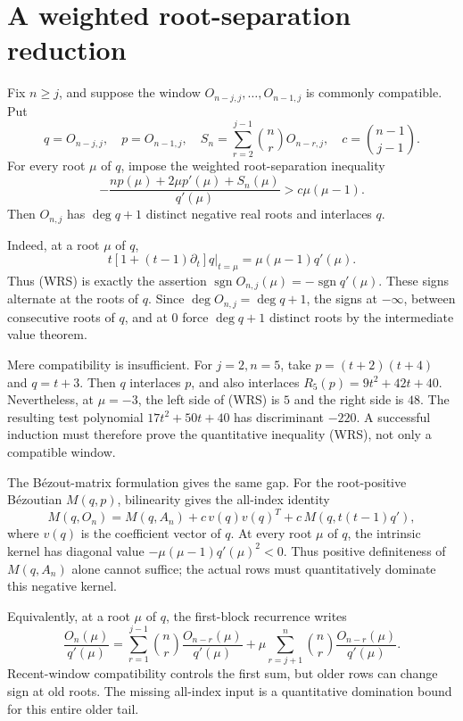 \documentclass[11pt]{article}
\theoremstyle{definition}
\newcommand{\OO}{O}
\begin{document}
\section{A weighted root-separation reduction}

Fix \(n\ge j\), and suppose the window
\(\OO_{n-j,j},\ldots,\OO_{n-1,j}\) is commonly compatible. Put
\[
q=\OO_{n-j,j},\quad p=\OO_{n-1,j},\quad
S_n=\sum_{r=2}^{j-1}\binom nr\OO_{n-r,j},\quad
c=\binom{n-1}{j-1}.
\]
For every root \(\mu\) of \(q\), impose the weighted root-separation inequality
\[
-\frac{n p(\mu)+2\mu p'(\mu)+S_n(\mu)}{q'(\mu)}
>c\mu(\mu-1). \tag{WRS}
\]
Then \(\OO_{n,j}\) has \(\deg q+1\) distinct negative real roots and
interlaces \(q\).

Indeed, at a root \(\mu\) of \(q\),
\[
t[1+(t-1)\partial_t]q\big|_{t=\mu}=\mu(\mu-1)q'(\mu).
\]
Thus (WRS) is exactly the assertion
\(\operatorname{sgn}\OO_{n,j}(\mu)=-\operatorname{sgn}q'(\mu)\).
These signs alternate at the roots of \(q\). Since
\(\deg\OO_{n,j}=\deg q+1\), the signs at \(-\infty\), between consecutive
roots of \(q\), and at \(0\) force \(\deg q+1\) distinct roots by the
intermediate value theorem.

Mere compatibility is insufficient. For \(j=2,n=5\), take
\(p=(t+2)(t+4)\) and \(q=t+3\). Then \(q\) interlaces \(p\), and also
interlaces \(R_5(p)=9t^2+42t+40\). Nevertheless, at \(\mu=-3\), the left side
of (WRS) is \(5\) and the right side is \(48\). The resulting test polynomial
\(17t^2+50t+40\) has discriminant \(-220\). A successful induction must
therefore prove the quantitative inequality (WRS), not only a compatible
window.

The Bézout-matrix formulation gives the same gap. For the root-positive
Bézoutian \(M(q,p)\), bilinearity gives the all-index identity
\[
M(q,\OO_n)=M(q,A_n)+c\,v(q)v(q)^T+c\,M(q,t(t-1)q'),
\]
where \(v(q)\) is the coefficient vector of \(q\). At every root \(\mu\) of
\(q\), the intrinsic kernel has diagonal value
\(-\mu(\mu-1)q'(\mu)^2<0\). Thus positive definiteness of \(M(q,A_n)\)
alone cannot suffice; the actual rows must quantitatively dominate this
negative kernel.

Equivalently, at a root \(\mu\) of \(q\), the first-block recurrence writes
\[
\frac{\OO_n(\mu)}{q'(\mu)}
=\sum_{r=1}^{j-1}\binom nr\frac{\OO_{n-r}(\mu)}{q'(\mu)}
+\mu\sum_{r=j+1}^{n}\binom nr\frac{\OO_{n-r}(\mu)}{q'(\mu)}.
\]
Recent-window compatibility controls the first sum, but older rows can change
sign at old roots. The missing all-index input is a quantitative domination
bound for this entire older tail.
\end{document}
